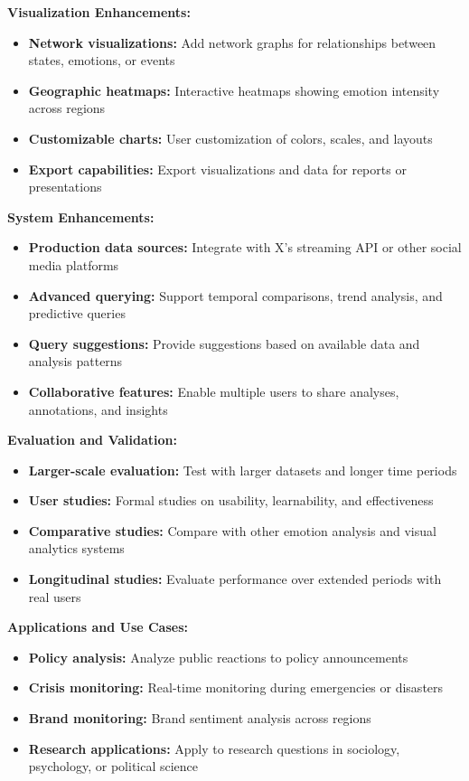 \textbf{Visualization Enhancements:}
\begin{itemize}
\item \textbf{Network visualizations:} Add network graphs for relationships between states, emotions, or events
\item \textbf{Geographic heatmaps:} Interactive heatmaps showing emotion intensity across regions
\item \textbf{Customizable charts:} User customization of colors, scales, and layouts
\item \textbf{Export capabilities:} Export visualizations and data for reports or presentations
\end{itemize}

\textbf{System Enhancements:}
\begin{itemize}
\item \textbf{Production data sources:} Integrate with X's streaming API or other social media platforms
\item \textbf{Advanced querying:} Support temporal comparisons, trend analysis, and predictive queries
\item \textbf{Query suggestions:} Provide suggestions based on available data and analysis patterns
\item \textbf{Collaborative features:} Enable multiple users to share analyses, annotations, and insights
\end{itemize}

\textbf{Evaluation and Validation:}
\begin{itemize}
\item \textbf{Larger-scale evaluation:} Test with larger datasets and longer time periods
\item \textbf{User studies:} Formal studies on usability, learnability, and effectiveness
\item \textbf{Comparative studies:} Compare with other emotion analysis and visual analytics systems
\item \textbf{Longitudinal studies:} Evaluate performance over extended periods with real users
\end{itemize}

\textbf{Applications and Use Cases:}
\begin{itemize}
\item \textbf{Policy analysis:} Analyze public reactions to policy announcements
\item \textbf{Crisis monitoring:} Real-time monitoring during emergencies or disasters
\item \textbf{Brand monitoring:} Brand sentiment analysis across regions
\item \textbf{Research applications:} Apply to research questions in sociology, psychology, or political science
\end{itemize}

